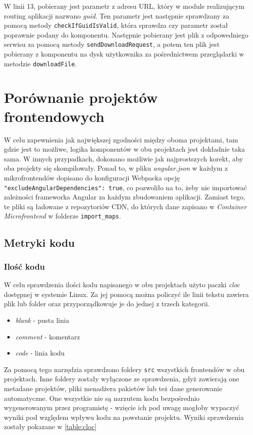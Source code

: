 \documentclass{SGGW-thesis}
\begin{document}
{  W linii 13, pobierany jest parametr z adresu URL, który w module realizującym routing aplikacji nazwano \textit{guid}. Ten parametr jest następnie sprawdzany za pomocą metody \lstinline{checkIfGuidIsValid}, która sprawdza czy parametr został poprawnie podany do komponentu. Następnie pobierany jest plik z odpowedniego serwisu za pomocą metody \lstinline{sendDownloadRequest}, a potem ten plik jest pobierany z komponentu na dysk użytkownika za pośrednictwem przeglądarki w metodzie \lstinline{downloadFile}.

\chapter{Porównanie projektów frontendowych}
  W celu zapewnienia jak największej zgodności między oboma projektami, tam gdzie jest to możliwe, logika komponentów w obu projektach jest dokładnie taka sama. W innych przypadkach, dokonano możliwie jak najprostszych korekt, aby oba projekty się skompilowały. Ponad to, w pliku \textit{angular.json} w każdym z mikrofrontendów dopisano do konfiguracji Webpacka opcję \lstinline{"excludeAngularDependencies": true}, co pozwoliło na to, żeby nie importować zależności frameworka Angular za każdym zbudowaniem aplikacji. Zamiast tego, te pliki są ładowane z repozytoriów CDN, do których dane zapisano w \textit{Container Microfrontend} w folderze \lstinline{import_maps}.

  \section{Metryki kodu}
    \subsection{Ilość kodu}
    W celu sprawdzenia ilości kodu napisanego w obu projektach użyto paczki \textit{cloc} dostępnej w systemie Linux. Za jej pomocą można policzyć ile linii tekstu zawiera plik lub folder oraz przyporządkowuje je do jednej z trzech kategorii.

    \begin{itemize}
      \item \textit{blank} - pusta linia
      \item \textit{comment} - komentarz
      \item \textit{code} - linia kodu
    \end{itemize}

    Za pomocą tego narzędzia sprawdzono foldery \lstinline{src} wszystkich frontendów w obu projektach. Inne foldery zostały wyłączone ze sprawdzenia, gdyż zawierają one metadane projektów, pliki menadżera pakietów lub też dane generowanie automatyczne. One wszystkie nie są narzutem kodu bezpośrednio wygenerowanym przez programistę - wzięcie ich pod uwagę mogłoby wypaczyć wyniki pod względem wpływu kodu na powstanie projektu. Wyniki sprawdzenia zostały pokazane w \cref{table:cloc}

}
\end{document}
